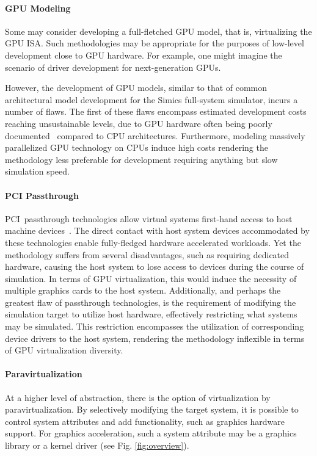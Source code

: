 \paragraph{GPU Modeling}
\label{par:previousresearch_graphicsvirtualization_gpumodeling}
Some may consider developing a full-fletched GPU model, that is, virtualizing the GPU ISA.
Such methodologies may be appropriate for the purposes of low-level development close to GPU hardware.
For example, one might imagine the scenario of driver development for next-generation GPUs.

However, the development of GPU models, similar to that of common architectural model development for the Simics full-system simulator, incurs a number of flaws.
The first of these flaws encompass estimated development costs reaching unsustainable levels, due to GPU hardware often being poorly documented~ compared to CPU architectures.
Furthermore, modeling massively parallelized GPU technology on CPUs induce high costs rendering the methodology less preferable for development requiring anything but slow simulation speed.

\paragraph{PCI Passthrough}
\label{par:previousresearch_graphicsvirtualization_pcipassthrough}
PCI~passthrough technologies allow virtual systems first-hand access to host machine devices~.
The direct contact with host system devices accommodated by these technologies enable fully-fledged hardware accelerated workloads.
Yet the methodology suffers from several disadvantages, such as requiring dedicated hardware, causing the host system to lose access to devices during the course of simulation.
In terms of GPU virtualization, this would induce the necessity of multiple graphics cards to the host system.
Additionally, and perhaps the greatest flaw of passthrough technologies, is the requirement of modifying the simulation target to utilize host hardware, effectively restricting what systems may be simulated.
This restriction encompasses the utilization of corresponding device drivers to the host system, rendering the methodology inflexible in terms of GPU virtualization diversity.

\paragraph{Paravirtualization}
\label{par:previousresearch_graphicsvirtualization_paravirtualization}
At a higher level of abstraction, there is the option of virtualization by paravirtualization.
By selectively modifying the target system, it is possible to control system attributes and add functionality, such as graphics hardware support.
For graphics acceleration, such a system attribute may be a graphics library or a kernel driver (see Fig. \ref{fig:overview}).

